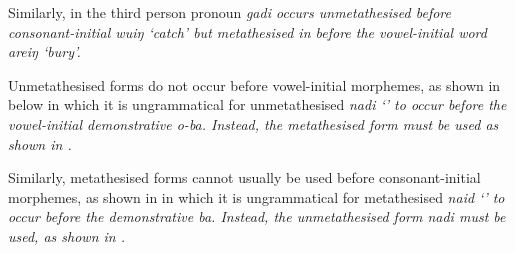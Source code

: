 Similarly, in  the third person
pronoun \it{gadi} occurs unmetathesised
before consonant-initial \it{wuiŋ} `catch' but metathesised
in  before the vowel-initial word \it{areiŋ} `bury'.

\newpage
\begin{exe}
\let\eachwordone=\itshape
	\label{ex:gadi}
	\label{ex:gaid}
\end{exe}

Unmetathesised forms do not occur before vowel-initial
morphemes, as shown in  below in which it
is ungrammatical for unmetathesised \it{nadi} `'
to occur before the vowel-initial demonstrative \it{o-ba}.
Instead, the metathesised form must be used as shown in .

\begin{exe}
\let\eachwordone=\itshape
	\label{ex:naid}
\end{exe}

Similarly, metathesised forms cannot usually be used before
consonant-initial morphemes, as shown in 
in which it is ungrammatical for metathesised \it{naid} `'
to occur before the demonstrative \it{ba}.
Instead, the unmetathesised form \it{nadi} must be used,
as shown in .

\begin{exe}
\let\eachwordone=\itshape
\end{exe}

